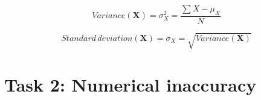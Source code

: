 \documentclass[english,a4paper,12pt,oneside]{article}
\begin{document}
\begin{equation}
 Variance(\mathbf{X}) = \sigma^2_X = \frac{\sum X - \mu_X}{N}
\end{equation}

\begin{equation}
 Standard\,deviation(\mathbf{X}) = \sigma_X = \sqrt{Variance(\mathbf{X})}
 \label{eq:std dev}
\end{equation}



% 





% 
% 
% 


\section*{Task 2: Numerical inaccuracy}
\end{document}

